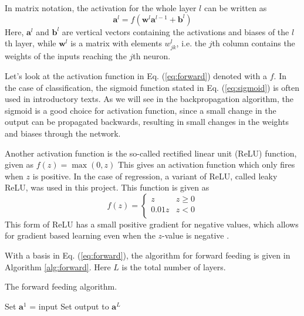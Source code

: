 In matrix notation, the activation for the whole layer $l$ can be written as
\begin{equation}\label{eq:forward}
	\boldsymbol{a}^l = f\left(\boldsymbol{w}^l\boldsymbol{a}^{l-1}+\boldsymbol{b}^l\right)
\end{equation}
Here, $\boldsymbol{a}^l$ and $\boldsymbol{b}^l$ are vertical vectors containing the activations and biases of the $l$th layer, while $\boldsymbol{w}^l$ is a matrix with elements $w^l_{jk}$, i.e. the $j$th column contains the weights of the inputs reaching the $j$th neuron.

Let's look at the activation function in Eq. (\ref{eq:forward}) denoted with a $f$. In the case of classification, the sigmoid function stated in Eq. (\ref{eq:sigmoid}) is often used in introductory texts. As we will see in the backpropagation algorithm, the sigmoid is a good choice for activation function, since a small change in the output can be propagated backwards, resulting in small changes in the weights and biases through the network.

Another activation function is the so-called rectified linear unit (ReLU) function, given as $f(z)=\max{\left(0,z\right)}$ This gives an activation function which only fires when $z$ is positive. In the case of regression, a variant of ReLU, called leaky ReLU, was used in this project. This function is given as
\begin{equation}\label{leakyReLU}
  f(z) = \begin{cases}
            z &z\geq 0 \\
            0.01z &z<0 \\
         \end{cases}
\end{equation}
This form of ReLU has a small positive gradient for negative values, which allows for gradient based learning even when the $z$-value is negative \citep{wang2018classification}.

With a basis in Eq. (\ref{eq:forward}), the algorithm for forward feeding is given in Algorithm \ref{alg:forward}. Here $L$ is the total number of layers.
\begin{algorithm}[htbp]\caption{The forward feeding algorithm.}\label{alg:forward}
	\SetAlgoLined
	\BlankLine
	\BlankLine
	Set $\boldsymbol{a}^1$ = input\;
	Set output to $\boldsymbol{a}^L$\;
	\BlankLine
	\BlankLine
\end{algorithm}

